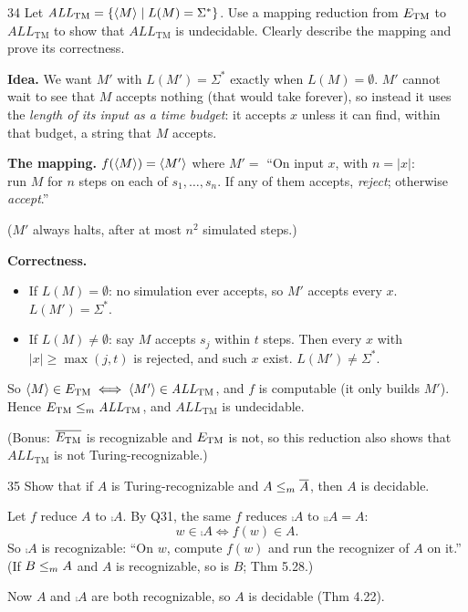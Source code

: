 \begin{question}{34}
Let $\mathit{ALL}_{\mathrm{TM}}=\{\langle M\rangle\mid L(M)=\Sigma^*\}$. Use a mapping reduction from $E_{\mathrm{TM}}$ to $\mathit{ALL}_{\mathrm{TM}}$ to show that $\mathit{ALL}_{\mathrm{TM}}$ is undecidable. Clearly describe the mapping and prove its correctness.
\end{question}
\begin{soln}
\textbf{Idea.} We want $M'$ with $L(M')=\Sigma^*$ exactly when $L(M)=\emptyset$. $M'$ cannot wait to see that $M$ accepts nothing (that would take forever), so instead it uses the \emph{length of its input as a time budget}: it accepts $x$ unless it can find, within that budget, a string that $M$ accepts.

\textbf{The mapping.} $f(\langle M\rangle)=\langle M'\rangle$ where
$M'=$ ``On input $x$, with $n=|x|$:\\
\hspace*{1.5em}run $M$ for $n$ steps on each of $s_1,\dots,s_n$. If any of them accepts, \emph{reject}; otherwise \emph{accept}.''


($M'$ always halts, after at most $n^2$ simulated steps.)

\textbf{Correctness.}
\begin{itemize}
\item If $L(M)=\emptyset$: no simulation ever accepts, so $M'$ accepts every $x$. $L(M')=\Sigma^*$.
\item If $L(M)\neq\emptyset$: say $M$ accepts $s_j$ within $t$ steps. Then every $x$ with $|x|\ge\max(j,t)$ is rejected, and such $x$ exist. $L(M')\neq\Sigma^*$.
\end{itemize}
So $\langle M\rangle\in E_{\mathrm{TM}}\iff\langle M'\rangle\in\mathit{ALL}_{\mathrm{TM}}$, and $f$ is computable (it only builds $M'$). Hence $E_{\mathrm{TM}}\le_{m}\mathit{ALL}_{\mathrm{TM}}$, and $\mathit{ALL}_{\mathrm{TM}}$ is undecidable.

(Bonus: $\overline{E_{\mathrm{TM}}}$ is recognizable and $E_{\mathrm{TM}}$ is not, so this reduction also shows that $\mathit{ALL}_{\mathrm{TM}}$ is not Turing-recognizable.)
\end{soln}

\begin{question}{35}
Show that if $A$ is Turing-recognizable and $A\le_{m}\overline{A}$, then $A$ is decidable.
\end{question}
\begin{soln}
Let $f$ reduce $A$ to $\comp A$. By Q31, the same $f$ reduces $\comp A$ to $\comp{\comp A}=A$:
\[
w\in\comp A\iff f(w)\in A .
\]
So $\comp A$ is recognizable: ``On $w$, compute $f(w)$ and run the recognizer of $A$ on it.'' (If $B\le_{m} A$ and $A$ is recognizable, so is $B$; Thm 5.28.)

Now $A$ and $\comp A$ are both recognizable, so $A$ is decidable (Thm 4.22).
\end{soln}

